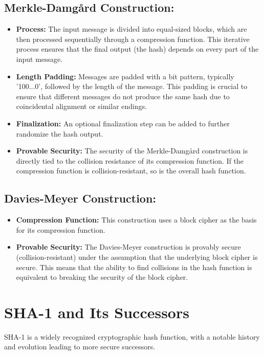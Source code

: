 \documentclass[12pt]{article}
\begin{document}
\subsection*{Merkle-Damgård Construction:}
\begin{itemize}
    \item \textbf{Process:} The input message is divided into equal-sized blocks, which are then processed sequentially through a compression function. This iterative process ensures that the final output (the hash) depends on every part of the input message.
    \item \textbf{Length Padding:} Messages are padded with a bit pattern, typically '100...0', followed by the length of the message. This padding is crucial to ensure that different messages do not produce the same hash due to coincidental alignment or similar endings.
    \item \textbf{Finalization:} An optional finalization step can be added to further randomize the hash output.
    \item \textbf{Provable Security:} The security of the Merkle-Damgård construction is directly tied to the collision resistance of its compression function. If the compression function is collision-resistant, so is the overall hash function.
\end{itemize}

\subsection*{Davies-Meyer Construction:}
\begin{itemize}
    \item \textbf{Compression Function:} This construction uses a block cipher as the basis for its compression function.
    \item \textbf{Provable Security:} The Davies-Meyer construction is provably secure (collision-resistant) under the assumption that the underlying block cipher is secure. This means that the ability to find collisions in the hash function is equivalent to breaking the security of the block cipher.
\end{itemize}

\section*{SHA-1 and Its Successors}

SHA-1 is a widely recognized cryptographic hash function, with a notable history and evolution leading to more secure successors.
\end{document}
